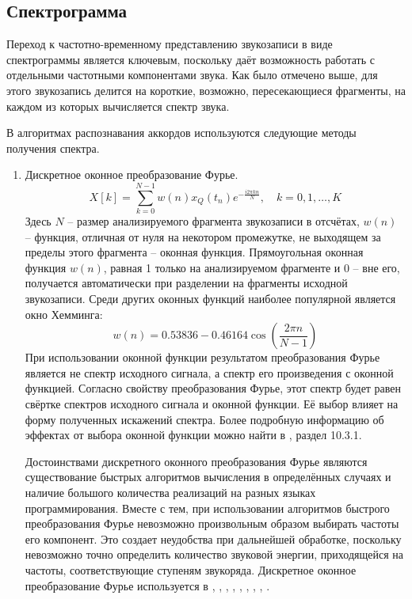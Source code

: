 \subsection{Спектрограмма} \label{ssectT_spect}

Переход к частотно-временному представлению звукозаписи в виде спектрограммы
является ключевым, поскольку даёт возможность работать с отдельными частотными
компонентами звука. Как было отмечено выше, для этого звукозапись делится на
короткие, возможно, пересекающиеся фрагменты, на каждом из которых вычисляется
спектр звука.

В алгоритмах распознавания аккордов используются следующие методы получения
спектра.
\begin{enumerate}
  \item Дискретное оконное преобразование Фурье.
  $$X[k] = \sum_{k=0}^{N-1} w(n)x_Q(t_n) e^{-\frac{i 2\pi kn}{N}}, \quad
  k=0, 1, \ldots, K$$
  Здесь $N$ -- размер анализируемого фрагмента звукозаписи в отсчётах, $w(n)$ --
  функция, отличная от нуля на некотором промежутке, не выходящем за пределы
  этого фрагмента -- оконная функция. Прямоугольная оконная функция $w(n)$,
  равная 1 только на анализируемом фрагменте и 0 -- вне его, получается
  автоматически при разделении на фрагменты исходной звукозаписи. Среди других
  оконных функций наиболее популярной является окно Хемминга:
  $$w(n) = 0.53836 - 0.46164 \cos \left( \frac{2\pi n}{N-1} \right)$$
  При использовании оконной функции результатом преобразования Фурье является не
  спектр исходного сигнала, а спектр его произведения с оконной функцией.  
  Согласно свойству преобразования Фурье, этот спектр будет равен свёртке
  спектров исходного сигнала и оконной функции. Её выбор влияет на форму
  полученных искажений спектра. Более подробную информацию об эффектах от выбора
  оконной функции можно найти в \cite{Oppenheim2006}, раздел 10.3.1.
  
  Достоинствами дискретного оконного преобразования Фурье являются существование
  быстрых алгоритмов вычисления в определённых случаях и наличие большого
  количества реализаций на разных языках программирования. Вместе с тем, при
  использовании алгоритмов быстрого преобразования Фурье невозможно произвольным
  образом выбирать частоты его компонент. Это создает неудобства при дальнейшей
  обработке, поскольку невозможно точно определить количество звуковой энергии,
  приходящейся на частоты, соответствующие ступеням звукоряда. Дискретное
  оконное преобразование Фурье используется в \cite{Sheh2003},
  \cite{Gomez2006}, \cite{Burgoyne2007}, \cite{Papadopoulos2007},
  \cite{Khadkevich2009}, \cite{Weller2009}, \cite{Mauch2010},
  \cite{Khadkevich2011}, \cite{DeHaas2012}.
  

\end{enumerate}
